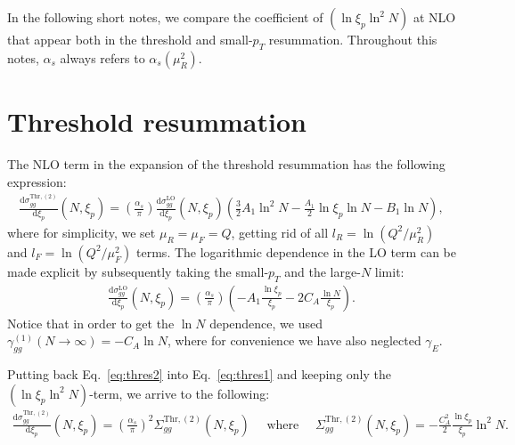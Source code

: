 \documentclass[10pt]{report}
\newcommand{\dd}{\mathrm{d}}
\begin{document}
	
\setcounter{page}{0}

In the following short notes, we compare the coefficient of $\left( \ln \xi_p \ln^2 N \right)$ at NLO that appear both in the 
threshold and small-$p_T$ resummation. Throughout this notes, $\alpha_s$ always refers to $\alpha_s \left( \mu_R^2 \right)$.

\section{Threshold resummation}

The NLO term in the expansion of the threshold resummation has the following expression:
\begin{align}
	\frac{\dd \sigma^{\text{Thr},(2)}_{gg}}{\dd \xi_p} (N, \xi_p) = \left( \frac{\alpha_s}{\pi} \right)
	\frac{\dd \sigma^{\text{LO}}_{gg}}{\dd \xi_p} (N, \xi_p) \left( \frac{3}{2} A_1 \ln^2N - \frac{A_1}{2} \ln \xi_p \ln N - B_1 \ln N
	\right),
	\label{eq:thres1}
\end{align}
where for simplicity, we set $\mu_R = \mu_F = Q$, getting rid of all $l_R = \ln \left( Q^2/\mu_R^2 \right)$ and $l_F = \ln \left( Q^2/\mu_F^2 \right)$
terms. The logarithmic dependence in the LO term can be made explicit by subsequently taking the small-$p_T$ and the large-$N$ limit:
\begin{align}
	\frac{\dd \sigma^{\text{LO}}_{gg}}{\dd \xi_p} (N, \xi_p) = \left( \frac{\alpha_s}{\pi} \right) \left( -A_1 \frac{\ln \xi_p}{\xi_p}
	- 2 C_A \frac{\ln N}{\xi_p} \right).
	\label{eq:thres2}
\end{align}
Notice that in order to get the $\ln N$ dependence, we used $\gamma^{(1)}_{gg} (N \to \infty) = - C_A \ln N$, where for convenience we
have also neglected $\gamma_E$. 

Putting back Eq.~\eqref{eq:thres2} into Eq.~\eqref{eq:thres1} and keeping only the $\left( \ln \xi_p \ln^2 N \right)$-term, 
we arrive to the following:
\begin{align}
	\frac{\dd \sigma^{\text{Thr},(2)}_{gg}}{\dd \xi_p} (N, \xi_p) = \left( \frac{\alpha_s}{\pi} \right)^2 \Sigma^{\text{Thr},(2)}_{gg} (N, \xi_p)
	\quad \text{ where } \quad \Sigma^{\text{Thr},(2)}_{gg} (N, \xi_p) = - \frac{C_A^2}{2} \frac{\ln \xi_p}{\xi_p} \ln^2N.
	\label{eq:thres_alphas2}
\end{align}
\end{document}
